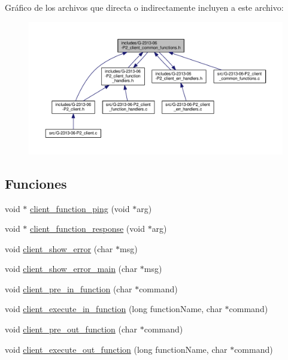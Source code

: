 Gráfico de los archivos que directa o indirectamente incluyen a este archivo\+:\nopagebreak
\begin{figure}[H]
\begin{center}
\leavevmode
\includegraphics[width=350pt]{G-2313-06-P2__client__common__functions_8h__dep__incl}
\end{center}
\end{figure}
\subsection*{Funciones}
\begin{DoxyCompactItemize}
\item 
void $\ast$ \hyperlink{G-2313-06-P2__client__common__functions_8h_a7297f848d5b0bd4990857d03cf3111e4}{client\+\_\+function\+\_\+ping} (void $\ast$arg)
\item 
void $\ast$ \hyperlink{G-2313-06-P2__client__common__functions_8h_afbd2dc7b3224fc3d2c5c9233b307c376}{client\+\_\+function\+\_\+response} (void $\ast$arg)
\item 
void \hyperlink{G-2313-06-P2__client__common__functions_8h_a03942275c5a503be4f7288cda71fb139}{client\+\_\+show\+\_\+error} (char $\ast$msg)
\item 
void \hyperlink{G-2313-06-P2__client__common__functions_8h_aa1f1dfdb0122f771b6c56edab7bc3613}{client\+\_\+show\+\_\+error\+\_\+main} (char $\ast$msg)
\item 
void \hyperlink{G-2313-06-P2__client__common__functions_8h_aa74c686c447b275e6a8cf36419033e81}{client\+\_\+pre\+\_\+in\+\_\+function} (char $\ast$command)
\item 
void \hyperlink{G-2313-06-P2__client__common__functions_8h_a6dd72e0b56b87f85d8cac2a30066198b}{client\+\_\+execute\+\_\+in\+\_\+function} (long function\+Name, char $\ast$command)
\item 
void \hyperlink{G-2313-06-P2__client__common__functions_8h_a68019fe1e0edcc71bb3dadeb70a86dcd}{client\+\_\+pre\+\_\+out\+\_\+function} (char $\ast$command)
\item 
void \hyperlink{G-2313-06-P2__client__common__functions_8h_a26512d35b24fec46c8fa4c803dc00867}{client\+\_\+execute\+\_\+out\+\_\+function} (long function\+Name, char $\ast$command)
\end{DoxyCompactItemize}



